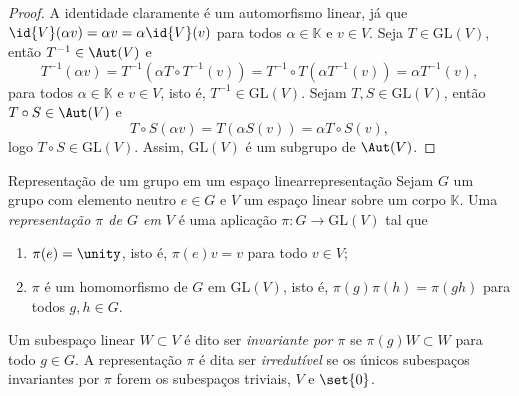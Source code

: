 \begin{proof}
    A identidade claramente é um automorfismo linear, já que \(\id{V}(\alpha v) = \alpha v = \alpha \id{V}(v)\) para todos \(\alpha \in \mathbb{K}\) e \(v \in V\). Seja \(T \in \mathrm{GL}(V)\), então \(T^{-1} \in \Aut(V)\) e
    \begin{equation*}
        T^{-1}(\alpha v) = T^{-1}\left(\alpha T \circ T^{-1}(v)\right) = T^{-1} \circ T \left(\alpha T^{-1}(v)\right) = \alpha T^{-1}(v),
    \end{equation*}
    para todos \(\alpha \in \mathbb{K}\) e \(v \in V\), isto é, \(T^{-1} \in \mathrm{GL}(V)\). Sejam \(T, S \in \mathrm{GL}(V)\), então \(T \circ S \in \Aut(V)\) e
    \begin{equation*}
        T \circ S(\alpha v) = T\left(\alpha S(v)\right) = \alpha T \circ S(v),
    \end{equation*}
    logo \(T \circ S \in \mathrm{GL}(V)\). Assim, \(\mathrm{GL}(V)\) é um subgrupo de \(\Aut(V)\).
\end{proof}

\begin{definition}{Representação de um grupo em um espaço linear}{representação}
    Sejam \(G\) um grupo com elemento neutro \(e \in G\) e \(V\) um espaço linear sobre um corpo \(\mathbb{K}\). Uma \emph{representação \(\pi\) de \(G\) em \(V\)} é uma aplicação \(\pi : G \to \mathrm{GL}(V)\) tal que
    \begin{enumerate}[label=(\alph*)]
        \item \(\pi(e) = \unity\), isto é, \(\pi(e)v = v\) para todo \(v \in V\);
        \item \(\pi\) é um homomorfismo de \(G\) em \(\mathrm{GL}(V)\), isto é, \(\pi(g)\pi(h) = \pi(gh)\) para todos \(g, h \in G\).
    \end{enumerate}
    Um subespaço linear \(W \subset V\) é dito ser \emph{invariante por \(\pi\)} se \(\pi(g)W \subset W\) para todo \(g \in G\). A representação \(\pi\) é dita ser \emph{irredutível} se os únicos subespaços invariantes por \(\pi\) forem os subespaços triviais, \(V\) e \(\set{0}\).
\end{definition}

